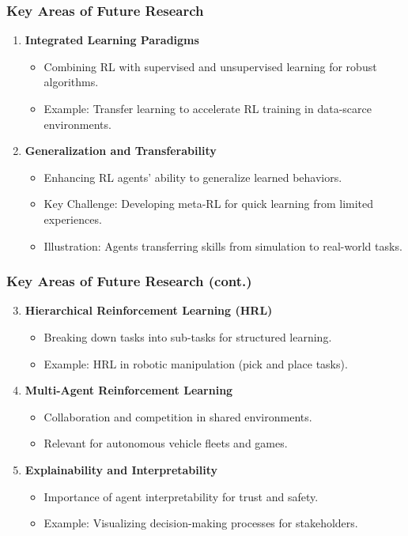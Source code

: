 \documentclass{beamer}
\begin{document}
\begin{frame}[fragile]
    \frametitle{Key Areas of Future Research}
    \begin{enumerate}
        \item \textbf{Integrated Learning Paradigms}
            \begin{itemize}
                \item Combining RL with supervised and unsupervised learning for robust algorithms.
                \item Example: Transfer learning to accelerate RL training in data-scarce environments.
            \end{itemize}
        \item \textbf{Generalization and Transferability}
            \begin{itemize}
                \item Enhancing RL agents' ability to generalize learned behaviors.
                \item Key Challenge: Developing meta-RL for quick learning from limited experiences.
                \item Illustration: Agents transferring skills from simulation to real-world tasks.
            \end{itemize}
    \end{enumerate}
\end{frame}

\begin{frame}[fragile]
    \frametitle{Key Areas of Future Research (cont.)}
    \begin{enumerate}
        \setcounter{enumi}{2}
        \item \textbf{Hierarchical Reinforcement Learning (HRL)}
            \begin{itemize}
                \item Breaking down tasks into sub-tasks for structured learning.
                \item Example: HRL in robotic manipulation (pick and place tasks).
            \end{itemize}
        \item \textbf{Multi-Agent Reinforcement Learning}
            \begin{itemize}
                \item Collaboration and competition in shared environments.
                \item Relevant for autonomous vehicle fleets and games.
            \end{itemize}
        \item \textbf{Explainability and Interpretability}
            \begin{itemize}
                \item Importance of agent interpretability for trust and safety.
                \item Example: Visualizing decision-making processes for stakeholders.
            \end{itemize}
    \end{enumerate}
\end{frame}
\end{document}
